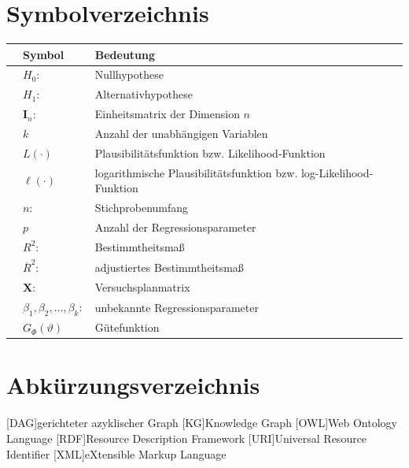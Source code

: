 \documentclass[12pt]{report}
\begin{document}
	\chapter*{Symbolverzeichnis} 
	\begin{table}[h] \begin{center} \begin{tabular}{|lll|} \hline 
				& \textbf{Symbol} & \textbf{Bedeutung} \\ \hline \hline
				& $H_0 \colon$ &Nullhypothese\\ 
				& $H_1 \colon$ &Alternativhypothese\\
				& $\mathbf{I}_n\colon$ &Einheitsmatrix der Dimension $n$\\
				& $k$ &Anzahl der unabhängigen Variablen\\
				& $L(\cdot)$ &Plausibilitätsfunktion bzw. Likelihood-Funktion\\ 
				& $\ell(\cdot)$ & logarithmische Plausibilitätsfunktion bzw. log-Likelihood-Funktion\\ 
				& $n\colon$& Stichprobenumfang\\
				& $p$ &Anzahl der Regressionsparameter\\
				& $R^2\colon$ & Bestimmtheitsmaß\\ 
				& $\overline{R}^2\colon$ & adjustiertes Bestimmtheitsmaß\\ 
				& $\mathbf{X}\colon$& Versuchsplanmatrix \\ 
				& $\beta_1,\beta_2, \ldots, \beta_k\colon$& unbekannte Regressionsparameter\\ 
				& $ G_\Phi(\vartheta)$& Gütefunktion\\ 
				\hline
	\end{tabular} \end{center} \end{table}
	\newpage
	\chapter*{Abkürzungsverzeichnis} 
	\begin{spacing}{0.1}
		\begin{acronym}		
			[DAG]{gerichteter azyklischer Graph}
			[KG]{Knowledge Graph}		
			[OWL]{Web Ontology Language}
			[RDF]{Resource Description Framework}
			[URI]{Universal Resource Identifier}
			[XML]{eXtensible Markup Language}
		\end{acronym}
	\end{spacing}	
	\newpage
	\clearpage
	\setcounter{page}{1} 
	\newpage
	\pagestyle{fancy}
	
\end{document}
